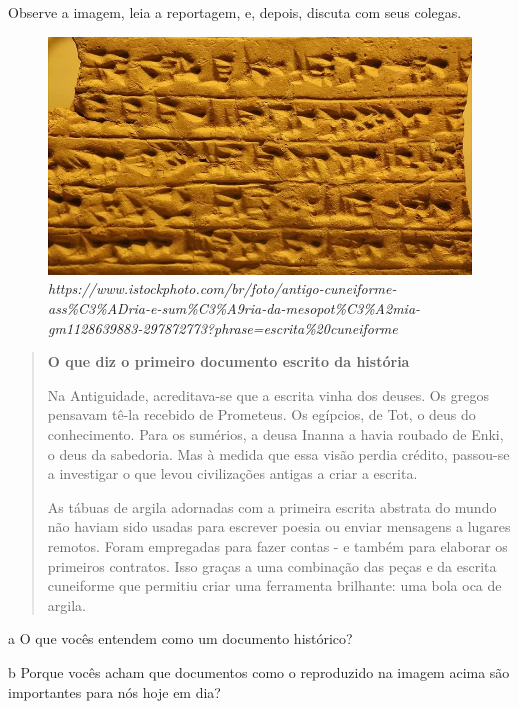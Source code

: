 Observe a imagem, leia a reportagem, e, depois, discuta com seus colegas.

\begin{figure}[htpb!]
\includegraphics[width=.5\textwidth]{./imgs/img31.png}
\caption{\emph{https://www.istockphoto.com/br/foto/antigo-cuneiforme-ass\%C3\%ADria-e-sum\%C3\%A9ria-da-mesopot\%C3\%A2mia-gm1128639883-297872773?phrase=escrita\%20cuneiforme}}
\end{figure}

\begin{quote}
\textbf{O que diz o primeiro documento escrito da história}

Na Antiguidade, acreditava-se que a escrita vinha dos deuses. Os gregos
pensavam tê-la recebido de Prometeus. Os egípcios, de Tot, o deus do
conhecimento. Para os sumérios, a deusa Inanna a havia roubado de Enki,
o deus da sabedoria. Mas à medida que essa visão perdia crédito,
passou-se a investigar o que levou civilizações antigas a criar a
escrita.

As tábuas de argila adornadas com a primeira escrita abstrata do mundo
não haviam sido usadas para escrever poesia ou enviar mensagens a
lugares remotos. Foram empregadas para fazer contas - e também para
elaborar os primeiros contratos. Isso graças a uma combinação das peças
e da escrita cuneiforme que permitiu criar uma ferramenta brilhante: uma
bola oca de argila.

\end{quote}

\num{a} O que vocês entendem como um documento histórico?


\num{b} Porque vocês acham que documentos como o reproduzido na imagem acima são
importantes para nós hoje em dia?

